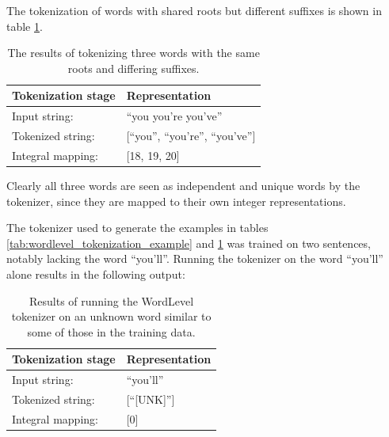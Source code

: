 \documentclass[12pt]{article}
\begin{document}
The tokenization of words with shared roots but different suffixes is shown in table \ref{tab:wordlevel_tokenization_shared_roots_example}.

\begin{table}[h!]
    \centering
    \begin{tabular}{l l}
        \toprule
        Tokenization stage & Representation                    \\
        \midrule
        Input string:      & ``you you're you've''             \\
        Tokenized string:  & [``you'', ``you're'', ``you've''] \\
        Integral mapping:  & [18, 19, 20]                      \\
        \bottomrule
    \end{tabular}
    \caption{The results of tokenizing three words with the same roots and differing suffixes.}
    \label{tab:wordlevel_tokenization_shared_roots_example}
\end{table}

\noindent
Clearly all three words are seen as independent and unique words by the tokenizer, since they are mapped to their own integer representations.

The tokenizer used to generate the examples in tables \ref{tab:wordlevel_tokenization_example} and
\ref{tab:wordlevel_tokenization_shared_roots_example} was trained on two sentences, notably lacking the word ``you'll''. Running the tokenizer on the
word ``you'll'' alone results in the following output:

\begin{table}[h!]
    \centering
    \begin{tabular}{l l}
        \toprule
        Tokenization stage & Representation \\
        \midrule
        Input string:      & ``you'll''     \\
        Tokenized string:  & [``[UNK]'']    \\
        Integral mapping:  & [0]            \\
        \bottomrule
    \end{tabular}
    \caption{Results of running the WordLevel tokenizer on an unknown word similar to some of those in the training data.}
    \label{tab:wordlevel_unk_word}
\end{table}
\end{document}
